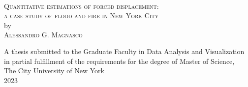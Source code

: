 \begin{titlepage}

\begin{center}

~\vspace{2in}


\textsc{Quantitative estimations of forced displacement: \\a case study of flood and fire in New York City} \\[0.5in]
by \\[0.5in]
\textsc{Alessandro G. Magnasco} 

\vspace{\fill}
A thesis submitted to the Graduate Faculty in Data Analysis and Visualization\\ in partial fulfillment of the requirements for the degree of Master of Science, \\The City University of New York \\[0.25in]
2023

\end{center}

\end{titlepage}
